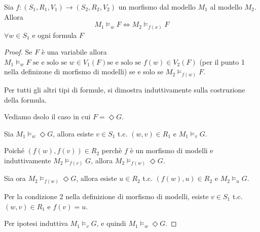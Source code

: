 \documentclass[10pt,a4paper,twoside]{book}
\begin{document}
\begin{lemma}[Lemma 1]
    Sia $f: (S_1, R_1, V_1) \rightarrow (S_2, R_2, V_2)$ un morfismo dal modello $M_1$ al modello $M_2$. Allora
    \begin{equation*}
        M_1 \vDash_w F \iff M_2 \vDash_{f(x)} F
    \end{equation*}
    $\forall w \in S_1$ e ogni formula $F$
\end{lemma}
\begin{proof}
    Se $F$ è una variabile allora $M_1 \vDash_w F \text{ se e solo se } w \in V_1(F) \text{se e solo se } f(w) \in V_2(F)$ (per il punto 1 nella definizone di morfismo di modelli) se e solo se $M_2 \vDash_{f(w)} F$.

    Per tutti gli altri tipi di formule, si dimostra induttivamente sulla costruzione della formula.

    Vediamo dsolo il caso in cui $F = \Diamond G$.

    Sia $M_1 \vDash_w \Diamond G$, allora esiste $v \in S_1$ t.c. $(w,v) \in R_1$ e $M_1 \vDash_v G$.

    Poiché $(f(w),f(v)) \in R_2$ perchè $f$ è un morfismo di modelli e induttivamente $M_2 \vDash_{f(v)} G$, allora $M_2 \vDash_{f(w)} \Diamond G$.

    Sia ora $M_2 \vDash_{f(w)} \Diamond G$, allora esiste $u \in R_2$ t.c. $(f(w),u) \in R_2$ e $M_2 \vDash_u G$.

    Per la condizione 2 nella definizione di morfismo di modelli, esiste $v \in S_1$ t.c. $(w,v) \in R_1$ e $f(v) = u$.

    Per ipotesi induttiva $M_1 \vDash_v G$, e quindi $M_1 \vDash_w \Diamond G$.
\end{proof}

\newpage
\end{document}

